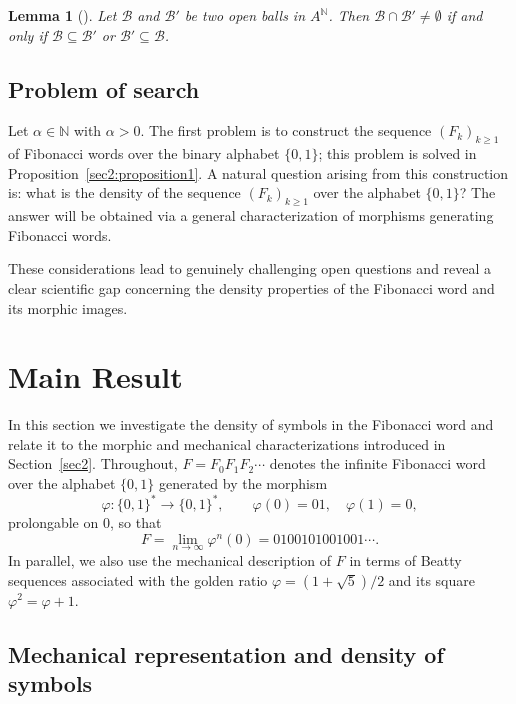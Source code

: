 \documentclass[12pt, a4paper]{article}
\newtheorem{lemma}[theorem]{Lemma}
\begin{document}
\begin{lemma}[\cite{Rigo2014}]\label{lemmageneraten2}
Let $\mathcal{B}$ and $\mathcal{B}'$ be two open balls in $A^{\mathbb{N}}$. Then $\mathcal{B} \cap \mathcal{B}' \neq \emptyset$ if and only if $\mathcal{B} \subseteq \mathcal{B}'$ or $\mathcal{B}' \subseteq \mathcal{B}$.
\end{lemma}

\subsection{Problem of search}
Let $\alpha \in \mathbb{N}$ with $\alpha > 0$. The first problem is to construct the sequence $(F_k)_{k \ge 1}$ of Fibonacci words over the binary alphabet $\{0,1\}$; this problem is solved in Proposition~\ref{sec2:proposition1}. A natural question arising from this construction is: what is the density of the sequence $(F_k)_{k \ge 1}$ over the alphabet $\{0,1\}$? The answer will be obtained via a general characterization of morphisms generating Fibonacci words.

These considerations lead to genuinely challenging open questions and reveal a clear scientific gap concerning the density properties of the Fibonacci word and its morphic images.

\section{Main Result}\label{sec:main}

In this section we investigate the density of symbols in the Fibonacci word and relate it to the morphic and mechanical characterizations introduced in Section~\ref{sec2}. Throughout, $F = F_0 F_1 F_2 \cdots$ denotes the infinite Fibonacci word over the alphabet $\{0,1\}$ generated by the morphism
\[
\varphi : \{0,1\}^* \to \{0,1\}^*,
\qquad
\varphi(0) = 01,\quad \varphi(1) = 0,
\]
prolongable on $0$, so that
\[
F = \lim_{n \to \infty} \varphi^n(0) = 0100101001001\cdots.
\]
In parallel, we also use the mechanical description of $F$ in terms of Beatty sequences associated with the golden ratio $\varphi = (1+\sqrt{5})/2$ and its square $\varphi^2 = \varphi + 1$.
\subsection{Mechanical representation and density of symbols}
\end{document}
